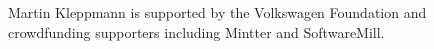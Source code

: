 \documentclass[sigconf,nonacm]{acmart}
\begin{document}



\begin{acks}
    Martin Kleppmann is supported by the Volkswagen Foundation and crowdfunding supporters including Mintter and SoftwareMill.
\end{acks}



\end{document}
